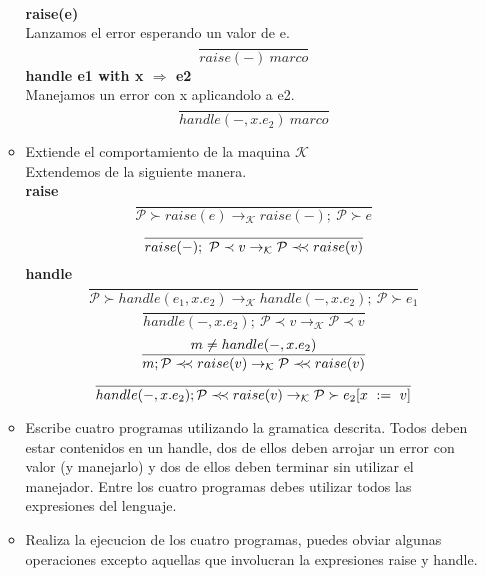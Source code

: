 \documentclass[11pt, a4paper]{report}
\newcommand{\precprec}{\prec\mathrel{\mkern-5mu}\prec}
\begin{document}
\begin{enumerate}
\begin{itemize}
			\\\textbf{raise(e)}
			\\Lanzamos el error esperando un valor de e.
			$$ \frac{}{raise(-)\ marco} $$
			\textbf{handle e1 with x $\Rightarrow$ e2}
			\\Manejamos un error con x aplicandolo a e2.
			$$ \frac{}{handle(-,x.e_{2})\ marco} $$
			\item Extiende el comportamiento de la maquina $\mathcal{K}$
			\\Extendemos de la siguiente manera.
			\\\textbf{raise}
			$$ \frac{}{\mathcal{P} \succ raise(e) \rightarrow_{\mathcal{K}} raise(-);\ \mathcal{P} \succ e}$$			
			$$ \frac{}{raise(-);\ \mathcal{P} \prec v \rightarrow_{\mathcal{K}} \mathcal{P} \precprec raise(v)}$$
			\textbf{handle}
			$$ \frac{}{\mathcal{P} \succ handle(e_{1},x.e_{2}) \rightarrow_{\mathcal{K}} handle(-,x.e_{2});\ \mathcal{P} \succ e_{1} } $$
			$$ \frac{}{handle(-,x.e_{2});\ \mathcal{P} \prec v \rightarrow_{\mathcal{K}} \mathcal{P} \prec v } $$
			$$ \frac{m \neq handle(-,x.e_{2})}{m;\mathcal{P} \precprec raise(v) \rightarrow_{\mathcal{K}} \mathcal{P} \precprec raise(v) } $$
			$$ \frac{}{handle(-,x.e_{2});\mathcal{P} \precprec raise(v) \rightarrow_{\mathcal{K}} \mathcal{P} \succ e_{2}[x\ :=\ v] } $$
			\item Escribe cuatro programas utilizando la gramatica descrita. Todos deben estar contenidos en un handle, dos de ellos deben arrojar un error con valor (y manejarlo) y dos de ellos deben terminar sin utilizar el manejador. Entre los cuatro programas debes utilizar todos las expresiones del lenguaje.
			\item Realiza la ejecucion de los cuatro programas, puedes obviar algunas operaciones excepto aquellas que involucran la expresiones raise y handle.
		\end{itemize}
\end{enumerate}
\end{document}
